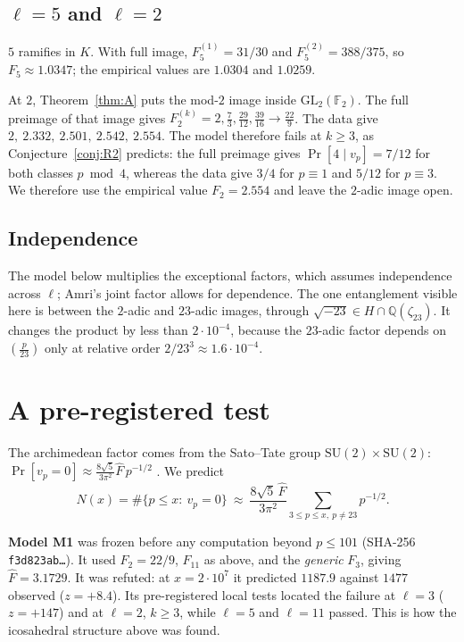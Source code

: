 \documentclass[11pt]{amsart}
\theoremstyle{definition}
\theoremstyle{remark}
\newcommand{\Q}{\mathbb{Q}}
\newcommand{\F}{\mathbb{F}}
\newcommand{\GL}{\mathrm{GL}}
\newcommand{\SU}{\mathrm{SU}}
\begin{document}
\subsection{\texorpdfstring{$\ell=5$ and $\ell=2$}{l=5 and l=2}}
$5$ ramifies in $K$. With full image, $F_5^{(1)}=31/30$ and $F_5^{(2)}=388/375$, so $F_5\approx1.0347$; the empirical values are $1.0304$ and $1.0259$.

At $2$, Theorem~\ref{thm:A} puts the mod-$2$ image inside $\GL_2(\F_2)$. The full preimage of that image gives $F_2^{(k)}=2,\tfrac73,\tfrac{29}{12},\tfrac{39}{16}\to\tfrac{22}9$. The data give $2,\ 2.332,\ 2.501,\ 2.542,\ 2.554$. The model therefore fails at $k\ge3$, as Conjecture~\ref{conj:R2} predicts: the full preimage gives $\Pr[4\mid v_p]=7/12$ for both classes $p\bmod 4$, whereas the data give $3/4$ for $p\equiv1$ and $5/12$ for $p\equiv3$. We therefore use the empirical value $F_2=2.554$ and leave the $2$-adic image open.

\subsection{Independence}
The model below multiplies the exceptional factors, which assumes independence across $\ell$; Amri's joint factor \cite{Amri} allows for dependence. The one entanglement visible here is between the $2$-adic and $23$-adic images, through $\sqrt{-23}\in H\cap\Q(\zeta_{23})$. It changes the product by less than $2\cdot10^{-4}$, because the $23$-adic factor depends on $\left(\frac{p}{23}\right)$ only at relative order $2/23^3\approx1.6\cdot10^{-4}$.

\section{A pre-registered test}\label{sec:test}

The archimedean factor comes from the Sato--Tate group $\SU(2)\times\SU(2)$: $\Pr[v_p=0]\approx\frac{8\sqrt5}{3\pi^2}\widehat F\,p^{-1/2}$ \cite[Lemma~4.5]{VH}. We predict
\[
N(x)=\#\{p\le x:\ v_p=0\}\ \approx\ \frac{8\sqrt5\,\widehat F}{3\pi^2}\sum_{3\le p\le x,\ p\neq23}p^{-1/2}.
\]

\textbf{Model M1} was frozen before any computation beyond $p\le101$ (SHA-256 \texttt{f3d823ab\ldots}). It used $F_2=22/9$, $F_{11}$ as above, and the \emph{generic} $F_3$, giving $\widehat F=3.1729$. It was refuted: at $x=2\cdot10^7$ it predicted $1187.9$ against $1477$ observed ($z=+8.4$). Its pre-registered local tests located the failure at $\ell=3$ ($z=+147$) and at $\ell=2$, $k\ge3$, while $\ell=5$ and $\ell=11$ passed. This is how the icosahedral structure above was found.
\end{document}
